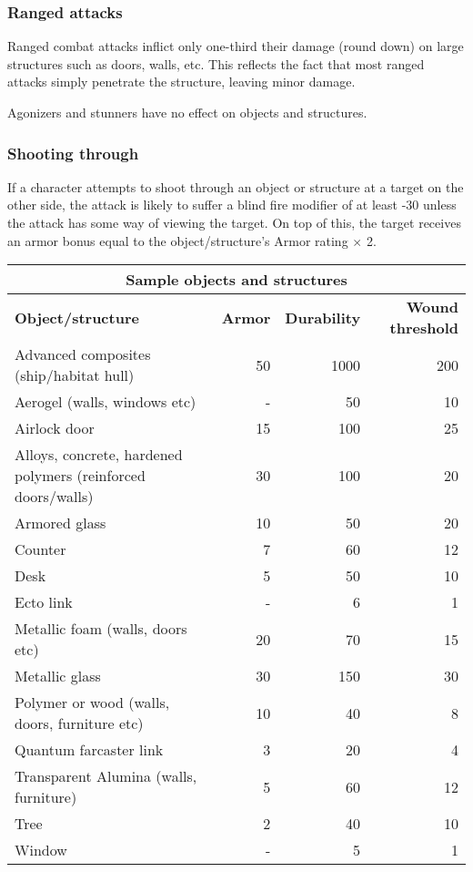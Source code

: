 \subsubsection{Ranged attacks}

Ranged combat attacks inflict only one-third their damage (round down) on large structures such as doors, walls, etc. This reflects the fact that most ranged attacks simply penetrate the structure, leaving minor damage.

Agonizers and stunners have no effect on objects and structures.

\subsubsection{Shooting through}

If a character attempts to shoot through an object or structure at a target on the other side, the attack is likely to suffer a blind fire modifier of at least -30 unless the attack has some way of viewing the target. On top of this, the target receives an armor bonus equal to the object/structure’s Armor rating $\times$ 2.

\begin{table}
\begin{tabularx}{\textwidth}{|X|r|r|r|}
\hline
\multicolumn{4}{|c|}{\textbf{Sample objects and structures}} \\
\hline
\textbf{Object/structure} & \textbf{Armor} & \textbf{Durability} & \textbf{Wound threshold}	\\
\hline
Advanced composites (ship/habitat hull)						& 50	& 1000	& 200		\\
\hline
Aerogel (walls, windows etc)								& -	& 50		& 10			\\
\hline
Airlock door											& 15	& 100	& 25			\\
\hline
Alloys, concrete, hardened polymers (reinforced doors/walls)	& 30	& 100	& 20			\\
\hline
Armored glass											& 10	& 50		& 20			\\
\hline
Counter												& 7	& 60		& 12			\\
\hline
Desk													& 5	& 50		& 10			\\
\hline
Ecto link												& -	& 6		& 1			\\
\hline
Metallic foam (walls, doors etc)							& 20	& 70		& 15			\\
\hline
Metallic glass											& 30	& 150	& 30			\\
\hline
Polymer or wood (walls, doors, furniture etc)				& 10	& 40		& 8			\\
\hline
Quantum farcaster link									& 3	& 20		& 4			\\
\hline
Transparent Alumina (walls, furniture)						& 5	& 60		& 12			\\
\hline
Tree													& 2	& 40		& 10			\\
\hline
Window												& -	& 5		& 1			\\
\hline
\end{tabularx}
\label{tab:sample-objects-structures}
\end{table}

